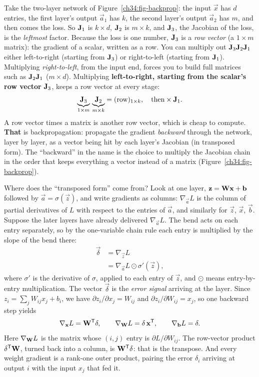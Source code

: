 Take the two-layer network of Figure~\ref{ch34:fig-backprop}: the input $\vec{x}$ has $d$
entries, the first layer's output $\vec{a}_1$ has $k$, the second layer's output
$\vec{a}_2$ has $m$, and then comes the loss. So $\mathbf{J}_1$ is $k\times d$, $\mathbf{J}_2$
is $m\times k$, and $\mathbf{J}_3$, the Jacobian of the loss, is the \emph{leftmost} factor.
Because the loss is one number, $\mathbf{J}_3$ is a \emph{row vector} (a $1\times m$ matrix):
the gradient of a scalar, written as a row. You can multiply out
$\mathbf{J}_3\mathbf{J}_2\mathbf{J}_1$ either left-to-right (starting from $\mathbf{J}_3$) or
right-to-left (starting from $\mathbf{J}_1$). Multiplying \emph{right-to-left}, from the input
end, forces you to build full matrices such as $\mathbf{J}_2\mathbf{J}_1$ ($m\times d$).
Multiplying \textbf{left-to-right, starting from the scalar's row vector} $\mathbf{J}_3$,
keeps a row vector at every stage:
\[
\underbrace{\mathbf{J}_3}_{1\times m}\,\underbrace{\mathbf{J}_2}_{m\times k}
= (\text{row})_{1\times k}, \quad \text{then} \times \mathbf{J}_1.
\]
A row vector times a matrix is another row vector, which is cheap to compute. \textbf{That}
is backpropagation: propagate the gradient \emph{backward} through the network, layer by
layer, as a vector being hit by each layer's Jacobian (in transposed form). The
``backward'' in the name is the choice to multiply the Jacobian chain in the order
that keeps everything a vector instead of a matrix (Figure~\ref{ch34:fig-backprop}).

Where does the ``transposed form'' come from? Look at one layer,
$\mathbf{z}=\mathbf{W}\mathbf{x}+\mathbf{b}$ followed by $\vec{a}=\sigma(\vec{z})$, and write
gradients as columns: $\nabla_{\vec{a}}L$ is the column of partial derivatives of $L$ with
respect to the entries of $\vec{a}$, and similarly for $\vec{z}$, $\vec{x}$, $\vec{b}$.
Suppose the later layers have already delivered $\nabla_{\vec{a}}L$. The bend acts on each
entry separately, so by the one-variable chain rule each entry is multiplied by the slope
of the bend there:
\begin{align*}
\vec{\delta} &= \nabla_{\vec{z}}L \\
&= \nabla_{\vec{a}}L\odot\sigma'(\vec{z}),
\end{align*}
where $\sigma'$ is the derivative of $\sigma$, applied to each entry of $\vec{z}$, and
$\odot$ means entry-by-entry multiplication. The vector $\vec{\delta}$ is the
\emph{error signal} arriving at the layer.
Since $z_i=\sum_j W_{ij}x_j+b_i$, we have $\partial z_i/\partial x_j=W_{ij}$ and
$\partial z_i/\partial W_{ij}=x_j$, so one backward step yields
\[
\nabla_{\mathbf{x}}L=\mathbf{W}^{\mathsf{T}}\mathbf{\delta},\qquad
\nabla_{\mathbf{W}}L=\mathbf{\delta}\,\mathbf{x}^{\mathsf{T}},\qquad
\nabla_{\mathbf{b}}L=\mathbf{\delta}.
\]
Here $\nabla_{\mathbf{W}}L$ is the matrix whose $(i,j)$ entry is $\partial L/\partial W_{ij}$.
The row-vector product $\mathbf{\delta}^{\mathsf{T}}\mathbf{W}$, turned back into a column, is
$\mathbf{W}^{\mathsf{T}}\mathbf{\delta}$: that is the transpose. And every weight gradient is a rank-one
outer product, pairing the error $\delta_i$ arriving at output $i$ with the input
$x_j$ that fed it.

